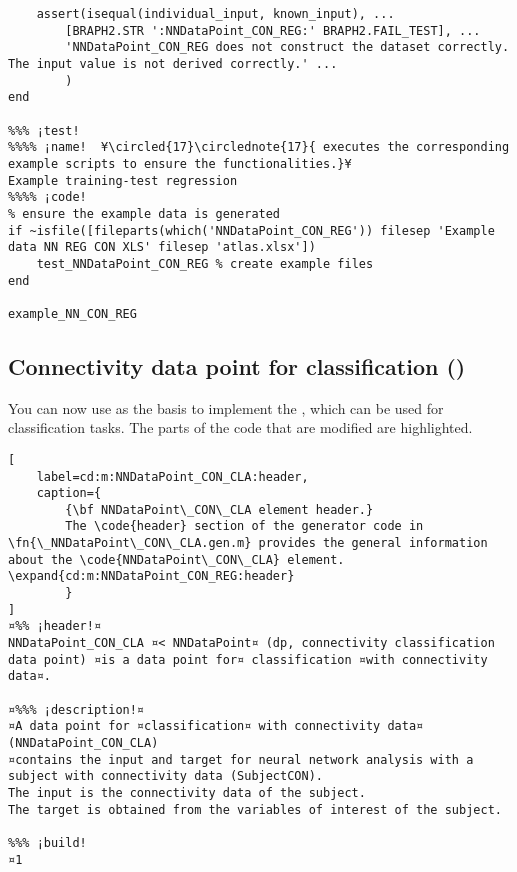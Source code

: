 \documentclass{tufte-handout}
\begin{document}
\begin{lstlisting}
    assert(isequal(individual_input, known_input), ...
        [BRAPH2.STR ':NNDataPoint_CON_REG:' BRAPH2.FAIL_TEST], ...
        'NNDataPoint_CON_REG does not construct the dataset correctly. The input value is not derived correctly.' ...
        )
end

%%% ¡test! 
%%%% ¡name!  ¥\circled{17}\circlednote{17}{ executes the corresponding example scripts to ensure the functionalities.}¥
Example training-test regression
%%%% ¡code!
% ensure the example data is generated
if ~isfile([fileparts(which('NNDataPoint_CON_REG')) filesep 'Example data NN REG CON XLS' filesep 'atlas.xlsx'])
    test_NNDataPoint_CON_REG % create example files
end

example_NN_CON_REG

\end{lstlisting}

\clearpage

\subsection{Connectivity data point for classification ()}

You can now use  as the basis to implement the , which can be used for classification tasks.
{%
The parts of the code that are modified are highlighted.
}%

\begin{lstlisting}[
	label=cd:m:NNDataPoint_CON_CLA:header,
	caption={
		{\bf NNDataPoint\_CON\_CLA element header.}
		The \code{header} section of the generator code in \fn{\_NNDataPoint\_CON\_CLA.gen.m} provides the general information about the \code{NNDataPoint\_CON\_CLA} element. \expand{cd:m:NNDataPoint_CON_REG:header}
		}
]
¤%% ¡header!¤
NNDataPoint_CON_CLA ¤< NNDataPoint¤ (dp, connectivity classification data point) ¤is a data point for¤ classification ¤with connectivity data¤.

¤%%% ¡description!¤
¤A data point for ¤classification¤ with connectivity data¤ (NNDataPoint_CON_CLA) 
¤contains the input and target for neural network analysis with a subject with connectivity data (SubjectCON).
The input is the connectivity data of the subject.
The target is obtained from the variables of interest of the subject.

%%% ¡build!
¤1
\end{lstlisting}
\end{document}
